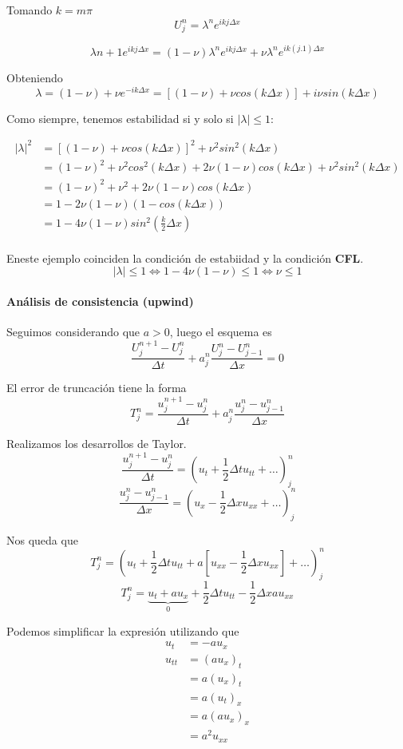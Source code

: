 Tomando $k=m\pi$
$$U_{j}^{n}=\lambda ^n e^{ikj\Delta x}$$ 

$$\lambda{n+1}e^{ikj\Delta x} = (1-\nu) \lambda ^n e^{ikj\Delta x}+\nu \lambda^ne^{ik(j.1)\Delta x}$$

Obteniendo 
$$\lambda = (1-\nu) + \nu e^{-ik\Delta x} = \left[(1-\nu)+\nu cos(k\Delta x)\right] + i\nu sin(k\Delta x)$$

Como siempre, tenemos estabilidad si y solo si $|\lambda|\le 1$:

\begin{align*}
|\lambda|^2 &= \left[(1-\nu)+\nu cos(k\Delta x)\right]^2 +\nu^2sin^2(k\Delta x)\\
&= (1-\nu)^2+\nu^2cos^2(k\Delta x) + 2\nu(1-\nu)cos(k\Delta x)+\nu^2 sin^2(k\Delta x)\\
&= (1-\nu)^2 + \nu^2 + 2\nu(1-\nu)cos(k\Delta x)\\
&= 1-2\nu(1-\nu)(1-cos(k\Delta x))\\
&= 1-4\nu (1-\nu)sin^2\left(\frac{k}{2}\Delta x\right)\\
\end{align*}

Eneste ejemplo coinciden la condición de estabiidad y la condición \textbf{CFL}.
$$|\lambda| \le 1 \iff 1-4\nu(1-\nu) \le 1 \iff \nu \le 1$$

\paragraph{Análisis de consistencia (upwind)}
Seguimos considerando que $a > 0$, luego el esquema es 
$$\frac{U_{j}^{n+1}-U_{j}^{n}}{\Delta t} + a_j^n\frac{U_{j}^{n}-U_{j-1}^{n}}{\Delta x} = 0$$

El error de truncación tiene la forma
$$T_j^n = \frac{u_{j}^{n+1}-u_{j}^{n}}{\Delta t} + a_j^n\frac{u_{j}^{n}-u_{j-1}^{n}}{\Delta x}$$

Realizamos los desarrollos de Taylor.
$$\frac{u_{j}^{n+1}-u_{j}^{n}}{\Delta t} = (u_t + \frac{1}{2}\Delta t u_{tt}+\hdots)_j^n$$
$$\frac{u_{j}^{n}-u_{j-1}^{n}}{\Delta x} = (u_x - \frac{1}{2}\Delta x u_{xx}+\hdots)_j^n$$

Nos queda que
$$T_j^n = (u_t+\frac{1}{2}\Delta t u_{tt}+ a \left[u_{xx}-\frac{1}{2}\Delta x u_{xx}\right]+\hdots)_j^n$$
$$T_j^n = \underbrace{u_t+au_x}_{0}+\frac{1}{2}\Delta t u_{tt}-\frac{1}{2}\Delta x a u_{xx}$$

Podemos simplificar la expresión utilizando que
\begin{align*}
	u_t & = -au_x\\
	u_{tt} &= (au_x)_t\\
	&= a(u_x)_t\\
	&= a(u_t)_x\\
	&= a(au_x)_x\\
	&= a^2u_{xx}
\end{align*}

